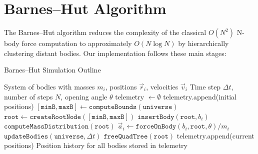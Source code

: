 \documentclass{article}
\begin{document}
\section{Barnes–Hut Algorithm}

The Barnes–Hut algorithm reduces the complexity of the classical \(O(N^2)\) N-body force computation to approximately \(O(N\log N)\) by hierarchically clustering distant bodies.  Our implementation follows these main stages:

\begin{algorithm}[H]
    \caption{Barnes–Hut Simulation Outline}\label{alg:bh}
    \begin{algorithmic}[1]
        \Require System of bodies with masses $m_i$, positions $\vec{r}_i$, velocities $\vec{v}_i$
        \Require Time step $\Delta t$, number of steps $N$, opening angle $\theta$
        \State telemetry $\gets \emptyset$
        \State telemetry.append(initial positions)
            \State $[\texttt{minB},\texttt{maxB}] \gets \texttt{computeBounds}(\texttt{universe})$
            \State $\texttt{root} \gets \texttt{createRootNode}([\texttt{minB},\texttt{maxB}])$
                \State $\texttt{insertBody}(\texttt{root}, b_i)$
            \EndFor
            \State $\texttt{computeMassDistribution}(\texttt{root})$
                \State $\vec{a}_i \gets \texttt{forceOnBody}(b_i,\texttt{root},\theta)/m_i$
            \EndFor
            \State $\texttt{updateBodies}(\texttt{universe}, \Delta t)$
            \State $\texttt{freeQuadTree}(\texttt{root})$
            \State telemetry.append(current positions)
        \EndFor
        \Ensure Position history for all bodies stored in telemetry
    \end{algorithmic}
\end{algorithm}
\end{document}
